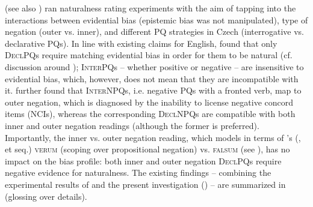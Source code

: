 \documentclass[output=paper,colorlinks,citecolor=brown]{langscibook}
\begin{document}
\citet{Stankova2023} (see also \citealt{Stankova.Simik2025}) ran naturalness rating experiments with the aim of tapping into the interactions between evidential bias (epistemic bias was not manipulated), type of negation (outer vs. inner), and different PQ strategies in Czech (interrogative vs. declarative PQs). In line with existing claims for English, \citeauthor{Stankova2023} found that only \textsc{DeclPQ}s require matching evidential bias in order for them to be natural (cf. discussion around ); \textsc{InterPQ}s -- whether positive or negative -- are insensitive to evidential bias, which, however, does not mean that they are incompatible with it. \citet{Stankova2023} further found that \textsc{InterNPQ}s, i.e. negative PQs with a fronted verb, map to outer negation, which is diagnosed by the inability to license negative concord items (NCIs), whereas the corresponding \textsc{DeclNPQ}s are compatible with both inner and outer negation readings (although the former is preferred). Importantly, the inner vs. outer negation reading, which \citet{Stankova2023} models in terms of \citeauthor{Repp2006}'s (\citeyear{Repp2006}, et seq.) \textsc{verum} (scoping over propositional negation) vs. \textsc{falsum} (see ), has no impact on the bias profile: both inner and outer negation \textsc{DeclPQ}s require negative evidence for naturalness. The existing findings -- combining the experimental results of \citet{Stankova2023} and the present investigation () -- are summarized in  (glossing over details).
\end{document}
